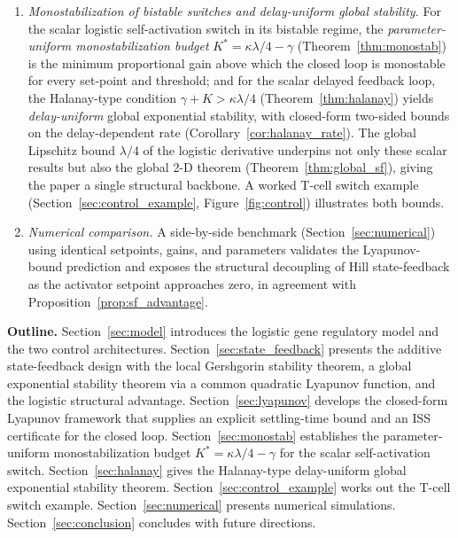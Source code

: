\documentclass[12pt]{article}
\begin{document}
\begin{enumerate}
        certificate scaling as $D/\rho$ under bounded disturbances
        $\|\boldsymbol{\eta}\|_2\leq D$ (Proposition~\ref{prop:iss}). The
        convergence rate $\rho=\min(\gamma_i+K_i)$ is arbitrarily
        accelerable by gain (Remark~\ref{rem:lyapunov_sf}), and the
        disturbance ultimate bound shrinks correspondingly. The same diagonal
        weighting certifies \emph{any} closed loop sharing this sign
        structure, so the Lyapunov certificate is architecture-independent.
  \item \emph{Monostabilization of bistable switches and delay-uniform
        global stability.} For the scalar logistic self-activation switch
        in its bistable regime, the
        \emph{parameter-uniform monostabilization budget}
        $K^{*}=\kappa\lambda/4-\gamma$ (Theorem~\ref{thm:monostab}) is the
        minimum proportional gain above which the closed loop is
        monostable for every set-point and threshold; and for the scalar
        delayed feedback loop, the Halanay-type condition
        $\gamma+K>\kappa\lambda/4$ (Theorem~\ref{thm:halanay}) yields
        \emph{delay-uniform} global exponential stability, with
        closed-form two-sided bounds on the delay-dependent rate
        (Corollary~\ref{cor:halanay_rate}). The global Lipschitz bound
        $\lambda/4$ of the logistic derivative underpins not only these
        scalar results but also the global 2-D theorem
        (Theorem~\ref{thm:global_sf}), giving the paper a single
        structural backbone. A worked
        T-cell switch example
        (Section~\ref{sec:control_example}, Figure~\ref{fig:control})
        illustrates both bounds.
  \item \emph{Numerical comparison.} A side-by-side benchmark
        (Section~\ref{sec:numerical}) using identical setpoints, gains, and
        parameters validates the Lyapunov-bound prediction and exposes the
        structural decoupling of Hill state-feedback as the activator
        setpoint approaches zero, in agreement with
        Proposition~\ref{prop:sf_advantage}.
\end{enumerate}

\medskip
\noindent\textbf{Outline.} Section~\ref{sec:model} introduces the
logistic gene regulatory model and the two control architectures.
Section~\ref{sec:state_feedback} presents the additive state-feedback
design with the local Gershgorin stability theorem, a global
exponential stability theorem via a common quadratic Lyapunov function,
and the logistic structural advantage. Section~\ref{sec:lyapunov} develops the
closed-form Lyapunov framework that supplies an explicit settling-time
bound and an ISS certificate for the closed loop.
Section~\ref{sec:monostab} establishes the parameter-uniform
monostabilization budget $K^*=\kappa\lambda/4-\gamma$ for the scalar
self-activation switch. Section~\ref{sec:halanay} gives the
Halanay-type delay-uniform global exponential stability theorem.
Section~\ref{sec:control_example} works out the T-cell switch example.
Section~\ref{sec:numerical} presents numerical simulations.
Section~\ref{sec:conclusion} concludes with future directions.
\end{document}
